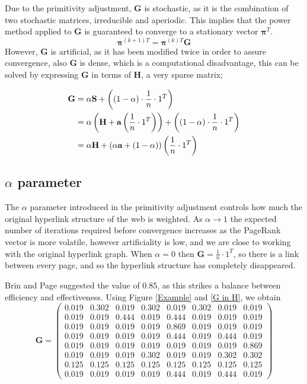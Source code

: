 \documentclass[11pt]{report}
\begin{document}
Due to the primitivity adjustment, \textbf{G} is stochastic, as it is the combination of two stochastic matrices, irreducible and aperiodic. This implies that the power method applied to \textbf{G} is guaranteed to converge to a stationary vector $\boldsymbol{\pi}^T$. \begin{equation}\label{power to G}
\boldsymbol{\pi}^{(k+1)T} = \boldsymbol{\pi}^{(k)T}\textbf{G}
\end{equation} However, \textbf{G} is artificial, as it has been modified twice in order to assure convergence, also \textbf{G} is dense, which is a computational disadvantage, this can be solved by expressing \textbf{G} in terms of \textbf{H}, a very sparse matrix; 

 
\begin{align}
\textbf{G} & = \alpha\textbf{S}+\left((1-\alpha)\cdot\frac{1}{n}\cdot1^T\right)\notag\\
& = \alpha \left(\textbf{H} + \textbf{a}\left(\frac{1}{n}\cdot 1^{T}\right)\right) + \left((1-\alpha)\cdot\frac{1}{n}\cdot1^T\right)\notag\\
& = \alpha\textbf{H} + (\alpha\textbf{a} +(1-\alpha))\left(\frac{1}{n}\cdot 1^T\right)\label{G in H}
\end{align}

\subsection{$\alpha$ parameter}
The $\alpha$ parameter introduced in the primitivity adjustment controls how much the original hyperlink structure of the web is weighted. As $\alpha \rightarrow 1$ the expected number of iterations required before convergence increases as the PageRank vector is more volatile, however artificiality is low, and we are close to working with the original hyperlink graph. When $\alpha =0$ then $\textbf{G}=\frac{1}{n}\cdot 1^T$, so there is a link between every page, and so the hyperlink structure has completely disappeared. 

Brin and Page suggested the value of 0.85, as this strikes a balance between efficiency and effectiveness. Using Figure \ref{Example} and \eqref{G in H}, we obtain
\begin{equation}
\textbf{G} = \left(
\begin{array}{cccccccc}
0.019 & 0.302 & 0.019 & 0.302 & 0.019 & 0.302 & 0.019 & 0.019  \\
0.019 & 0.019 & 0.444 & 0.019 & 0.444 & 0.019 & 0.019 & 0.019  \\
0.019 & 0.019 & 0.019 & 0.019 & 0.869 & 0.019 & 0.019 & 0.019  \\
0.019 & 0.019 & 0.019 & 0.019 & 0.444 & 0.019 & 0.444 & 0.019  \\
0.019 & 0.019 & 0.019 & 0.019 & 0.019 & 0.019 & 0.019 & 0.869  \\
0.019 & 0.019 & 0.019 & 0.302 & 0.019 & 0.019 & 0.302 & 0.302  \\
0.125 & 0.125 & 0.125 & 0.125 & 0.125 & 0.125 & 0.125 & 0.125  \\
0.019 & 0.019 & 0.019 & 0.019 & 0.444 & 0.019 & 0.444 & 0.019 
\end{array}
\right)
\end{equation}
\end{document}
